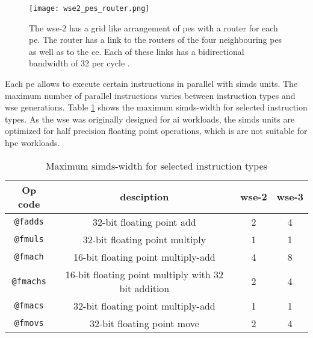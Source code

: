 \begin{figure}[h]
    \centering
    \texttt{[image: wse2\_pes\_router.png]}
    \caption{The \ac{wse}-2 has a grid like arrangement of \acp{pe} with a router for each \ac{pe}. The router has a link to the routers of the four neighbouring \acp{pe} as well as to the \ac{ce}. Each of these links has a bidirectional bandwidth of \qty{32}{\bit} per cycle \cite{lie2023cerebras}.}
    \label{fig:wse2_pes_router}
\end{figure}

Each \ac{pe} allows to execute certain instructions in parallel with \acp{simd} units. The maximum number of parallel instructions varies between instruction types and \ac{wse} generations. Table \ref{tab:simd_operations} shows the maximum \acp{simd}-width for selected instruction types. As the \ac{wse} was originally designed for \ac{ai} workloads, the \acp{simd} units are optimized for half precision floating point operations, which is are not suitable for \ac{hpc} workloads.

\begin{table}[h]
    \centering
    \caption{Maximum \acp{simd}-width for selected instruction types}
    \label{tab:simd_operations}
    \begin{tabular}{@{}cccc@{}}
        \toprule
        Op code & desciption & \ac{wse}-2 & \ac{wse}-3 \\
        \midrule
        \texttt{@fadds} & 32-bit floating point add & 2 & 4 \\
        \texttt{@fmuls} & 32-bit floating point multiply & 1 & 1 \\
        \texttt{@fmach} & 16-bit floating point multiply-add & 4 & 8 \\
        \texttt{@fmachs} & 16-bit floating point multiply with 32 bit addition & 2 & 4 \\
        \texttt{@fmacs} & 32-bit floating point multiply-add & 1 & 1 \\
        \texttt{@fmovs} & 32-bit floating point move & 2 & 4 \\
        \bottomrule
    \end{tabular}
\end{table}

